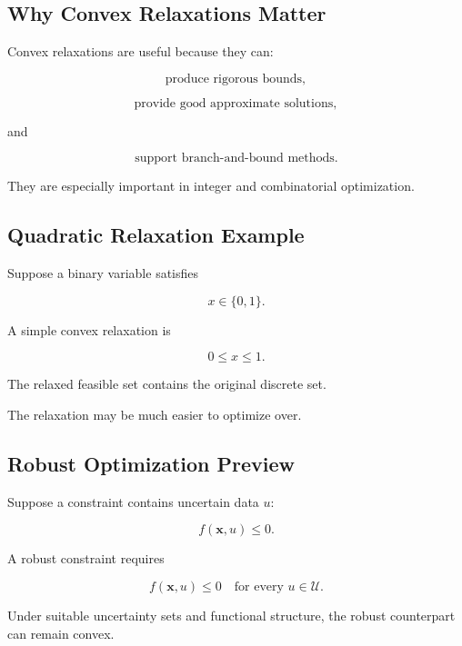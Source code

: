 \subsection{Why Convex Relaxations Matter}
\label{subsec:why-convex-relaxations}

Convex relaxations are useful because they can:

\[
\boxed{
\text{produce rigorous bounds},
}
\]

\[
\boxed{
\text{provide good approximate solutions},
}
\]

and

\[
\boxed{
\text{support branch-and-bound methods}.
}
\]

They are especially important in integer and combinatorial optimization.

\subsection{Quadratic Relaxation Example}
\label{subsec:quadratic-relaxation-example}

Suppose a binary variable satisfies

\[
x\in\{0,1\}.
\]

A simple convex relaxation is

\[
\boxed{
0\leq x\leq1.
}
\]

The relaxed feasible set contains the original discrete set.

The relaxation may be much easier to optimize over.

\subsection{Robust Optimization Preview}
\label{subsec:robust-convex-optimization-preview}

Suppose a constraint contains uncertain data \(u\):

\[
f(\mathbf{x},u)\leq0.
\]

A robust constraint requires

\[
\boxed{
f(\mathbf{x},u)\leq0
\quad
\text{for every }
u\in\mathcal{U}.
}
\]

Under suitable uncertainty sets and functional structure, the robust
counterpart can remain convex.

